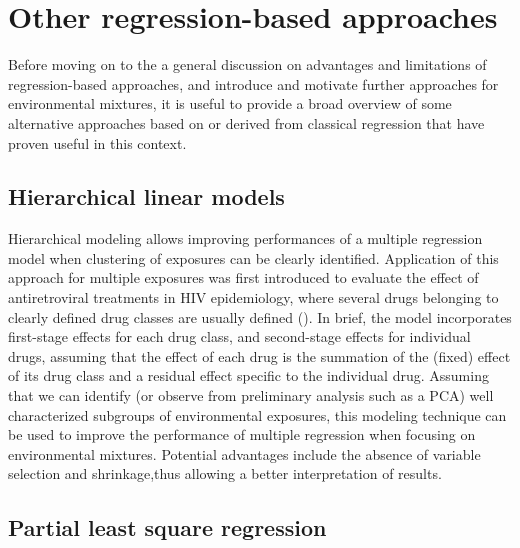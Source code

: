 \documentclass[
]{book}
\begin{document}
\hypertarget{other-regression-based-approaches}{%
\section{Other regression-based approaches}\label{other-regression-based-approaches}}

Before moving on to the a general discussion on advantages and limitations of regression-based approaches, and introduce and motivate further approaches for environmental mixtures, it is useful to provide a broad overview of some alternative approaches based on or derived from classical regression that have proven useful in this context.

\hypertarget{hierarchical-linear-models}{%
\subsection{Hierarchical linear models}\label{hierarchical-linear-models}}

Hierarchical modeling allows improving performances of a multiple regression model when clustering of exposures can be clearly identified. Application of this approach for multiple exposures was first introduced to evaluate the effect of antiretroviral treatments in HIV epidemiology, where several drugs belonging to clearly defined drug classes are usually defined (\citet{correia2019hierarchical}). In brief, the model incorporates first-stage effects for each drug class, and second-stage effects for individual drugs, assuming that the effect of each drug is the summation of the (fixed) effect of its drug class and a residual effect specific to the individual drug. Assuming that we can identify (or observe from preliminary analysis such as a PCA) well characterized subgroups of environmental exposures, this modeling technique can be used to improve the performance of multiple regression when focusing on environmental mixtures. Potential advantages include the absence of variable selection and shrinkage,thus allowing a better interpretation of results.

\hypertarget{partial-least-square-regression}{%
\subsection{Partial least square regression}\label{partial-least-square-regression}}
\end{document}
